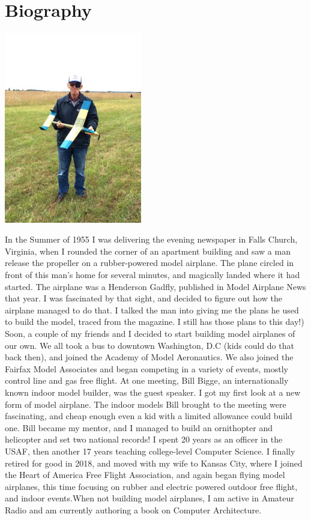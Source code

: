 \section*{Biography}
\begin{centering}
\includegraphics[width=0.45\textwidth]{../assets/images/RoieBlack.jpg}
\end{centering}

In the Summer of 1955 I was delivering the evening newspaper in Falls Church,
Virginia, when I rounded the corner of an apartment building and saw a man
release the propeller on a rubber-powered model airplane. The plane circled in
front of this man's home for several minutes, and magically landed where it had
started. The airplane was a Henderson Gadfly, published in Model Airplane News
that year.  I was fascinated by that sight, and decided to figure out how the
airplane managed to do that. I talked the man into giving me the plans he used
to build the model, traced from the magazine. I still has those plans to this
day!) Soon, a couple of my friends and I decided to start building model
airplanes of our own.  We all took a bus to downtown Washington, D.C (kids
could do that back then), and joined the Academy of Model Aeronautics. We also
joined the Fairfax Model Associates and began competing in a variety of events,
mostly control line and gas free flight. At one meeting, Bill Bigge, an
internationally known indoor model builder, was the guest speaker. I got my
first look at a new form of model airplane. The indoor models Bill brought to
the meeting were fascinating, and cheap enough even a kid with a limited
allowance could build one.  Bill became my mentor, and  I managed to build an
ornithopter and helicopter and set two national records! I spent 20 years as an
officer in the USAF, then another 17 years teaching college-level Computer
Science. I finally retired for good in 2018, and moved with my wife to Kansas
City, where I joined the Heart of America Free Flight Association, and again
began flying model airplanes, this time focusing on rubber and electric powered
outdoor free flight, and indoor events.When not building model airplanes, I am
active in Amateur Radio and am currently authoring a book on Computer
Architecture.
